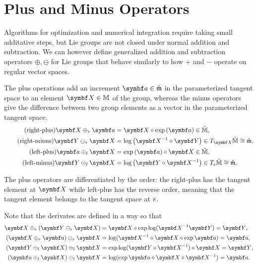 \section{Plus and Minus Operators}

Algorithms for optimization and numerical integration require taking small additative steps, but Lie groups are not closed under normal addition and subtraction. We can however define generalized addition and subtraction operators $\oplus, \ominus$ for Lie groups that behave similarly to how $+$ and $-$ operate on regular vector spaces.


\begin{important}%
  The plus operations add an increment $\a \in \clM$ in the parameterized tangent space to an element $\X \in \M$ of the group, whereas the minus operators give the difference between two group elements as a vector in the parameterized tangent space.
  \begin{align}
    \label{eq:right-plus}
    \tag{right-plus} \X \oplus_r {{\a}}
     & = \X \circ \exp \left( {{\a}} \right) \in \cM,                     \\
    \label{eq:right-minus}
    \tag{right-minus}\Y \ominus_r \X
     & =  \log \left( \X^{-1} \circ \Y \right) \in T_{\X} \cM \cong \clM, \\
    \label{eq:left-plus}
    \tag{left-plus} \a \oplus_l \X
     & = \exp \left( {{\a}} \right) \circ \X \in \cM,                     \\
    \label{eq:left-minus}
    \tag{left-minus}\Y \ominus_l \X
     & =  \log \left( \Y \circ \X^{-1} \right) \in T_\id \cM \cong \clM .
  \end{align}
\end{important}
The plus operators are differentiated by the order: the right-plus has the tangent element at $\X$ while left-plus has the reverse order, meaning that the tangent element belongs to the tangent space at $e$.

Note that the derivates are defined in a way so that
\begin{subequations}
  \begin{align}
    \X \oplus_r (\Y \ominus_r \X ) & = \X \circ \exp \log (\X^{-1} \Y) = \Y,                                     \\
    (\X \oplus_r \a) \ominus_r \X  & = \log (\X^{-1} \circ \X \circ \exp \a) = \a,   \label{eq:x_plus_a_minus_x} \\
    (\Y \ominus_l \X ) \oplus_l \X & = \exp \log (\Y \circ \X^{-1}) \circ \X = \Y,                               \\
    (\a \oplus_l \X) \ominus_l \X  & = \log (\exp \a \circ \X \circ \X^{-1}) = \a.
  \end{align}
\end{subequations}


